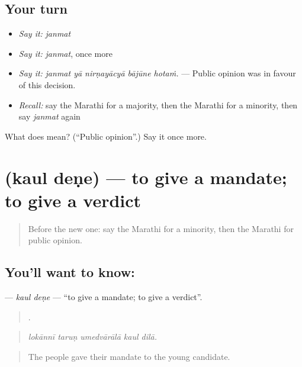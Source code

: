\subsection*{Your turn}
\begin{itemize}
\raggedright
  \item \emph{Say it:} \emph{janmat}
  \item \emph{Say it:} \emph{janmat}, once more
  \item \emph{Say it:} \emph{janmat yā nirṇayācyā bājūne hotaṁ.} — Public opinion was in favour of this decision.
  \item \emph{Recall:} say the Marathi for a majority, then the Marathi for a minority, then say \emph{janmat} again
\end{itemize}

\begin{tcolorbox}[breakable,colback=teal!4,colframe=teal!35!black,title={Before you move on}]
What does  mean? (\textquotedblleft{}Public opinion\textquotedblright{}.) Say it once more.
\end{tcolorbox}
\section[\texorpdfstring{\mr{कौल} \mr{देणे} (kaul deṇe)}{कौल देणे (kaul deṇe)}]{  (kaul deṇe) — to give a mandate; to give a verdict}

\label{lesson:MR-C356-kaul-dene}



\begin{quote}
Before the new one: say the Marathi for a minority, then the Marathi for public opinion.
\end{quote}

\subsection*{You'll want to know:  }
\textbf{ } — \emph{kaul deṇe} — \textquotedblleft{}to give a mandate; to give a verdict\textquotedblright{}.

\begin{quote}
    .
\end{quote}

\begin{quote}
\emph{lokānnī taruṇ umedvārālā kaul dilā.}
\end{quote}

\begin{quote}
The people gave their mandate to the young candidate.
\end{quote}

